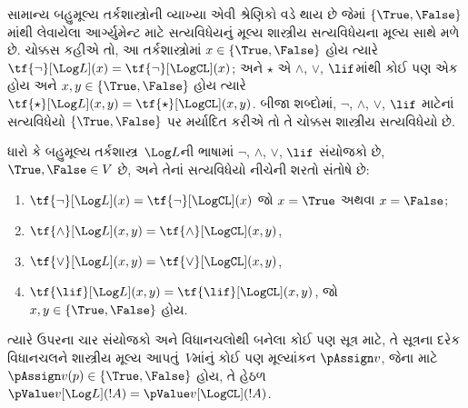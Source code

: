 \documentclass[../../../include/open-logic-section]{subfiles}
\begin{document}


સામાન્ય બહુમૂલ્ય તર્કશાસ્ત્રોની વ્યાખ્યા એવી શ્રેણિકો વડે થાય છે જેમાં
$\{\True, \False\}$માંથી લેવાયેલા આર્ગ્યુમેન્ટ માટે સત્યવિધેયનું
મૂલ્ય શાસ્ત્રીય સત્યવિધેયના મૂલ્ય સાથે મળે છે. ચોક્કસ કહીએ તો, આ
તર્કશાસ્ત્રોમાં $x \in \{\True, \False\}$ હોય ત્યારે
$\tf{\lnot}[\Log L](x) = \tf{\lnot}[\LogCL](x)$; અને $\star$ એ
$\land$, $\lor$, $\lif$માંથી કોઈ પણ એક હોય અને
$x, y \in \{\True, \False\}$ હોય ત્યારે
$\tf{\star}[\Log L](x,y) = \tf{\star}[\LogCL](x,y)$.
બીજા શબ્દોમાં, $\lnot$, $\land$, $\lor$, $\lif$ માટેનાં સત્યવિધેયો
$\{\True,\False\}$ પર મર્યાદિત કરીએ તો તે ચોક્કસ શાસ્ત્રીય
સત્યવિધેયો છે.

\begin{prop}
  ધારો કે બહુમૂલ્ય તર્કશાસ્ત્ર~$\Log L$ની ભાષામાં $\lnot$, $\land$,
  $\lor$, $\lif$ સંયોજકો છે, $\True, \False \in V$ છે, અને તેનાં
  સત્યવિધેયો નીચેની શરતો સંતોષે છે:
  \begin{enumerate}
    \item{} $\tf{\lnot}[\Log L](x) = \tf{\lnot}[\LogCL](x)$ જો $x =
    \True$ અથવા $x = \False$;
    \item{} $\tf{\land}[\Log L](x,y) = \tf{\land}[\LogCL](x,y)$,
    \item{} $\tf{\lor}[\Log L](x,y) = \tf{\lor}[\LogCL](x,y)$,
    \item{} $\tf{\lif}[\Log L](x,y) = \tf{\lif}[\LogCL](x,y)$,
    જો $x, y \in \{\True, \False\}$ હોય.
  \end{enumerate}
  ત્યારે ઉપરના ચાર સંયોજકો અને વિધાનચલોથી બનેલા કોઈ પણ સૂત્ર માટે,
  તે સૂત્રના દરેક વિધાનચલને શાસ્ત્રીય મૂલ્ય આપતું~$V$માંનું
  કોઈ પણ મૂલ્યાંકન $\pAssign v$, જેના માટે
  $\pAssign v(p) \in \{\True,\False\}$ હોય, તે હેઠળ
  $\pValue v[\Log L](!A) = \pValue v[\LogCL](!A)$.
\end{prop}
\end{document}
